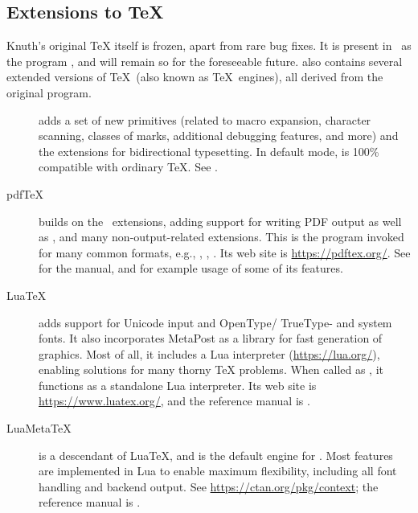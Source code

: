 \documentclass[12pt]{article}
\begin{document}
\subsection{Extensions to \protect\TeX}
\label{sec:tex-extensions}

Knuth's original \TeX{} itself is frozen, apart from rare bug fixes. It
is present in \TL\ as the program , and will remain so
for the foreseeable future.  \TL{} also contains several extended versions of
\TeX\ (also known as \TeX\ engines), all derived from the original program.

\begin{description}

\item [\eTeX] adds a set of new primitives
\label{text:etex} (related to macro expansion, character scanning,
classes of marks, additional debugging features, and more) and the
\TeXXeT{} extensions for bidirectional typesetting.  In default mode,
\eTeX{} is 100\% compatible with ordinary \TeX. See
.

\item [pdf\TeX] builds on the \eTeX\ extensions, adding support for
writing PDF output as well as \dvi{}, and many non-output-related
extensions.  This is the program invoked for many common formats, e.g.,
, , .  Its web site is
\url{https://pdftex.org/}.  See
 for the manual, and
 for example
usage of some of its features.

\item [Lua\TeX] adds support for Unicode input and OpenType\slash
TrueType- and system fonts. It also incorporates MetaPost as a library
for fast generation of graphics. Most of all, it includes a Lua interpreter
(\url{https://lua.org/}), enabling solutions for many thorny \TeX{}
problems. When called as , it functions as a standalone
Lua interpreter. Its web site is \url{https://www.luatex.org/}, and the
reference manual is .

\item [LuaMeta\TeX] is a descendant of Lua\TeX, and is the default
engine for \ConTeXt. Most features are implemented in Lua to enable
maximum flexibility, including all font handling and backend output.
See \url{https://ctan.org/pkg/context}; the reference manual is
.


\end{description}
\end{document}
